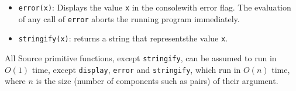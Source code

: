 \begin{itemize}
\item \texttt{error(x)}: Displays the value \texttt{x} in the console\footnotemark[\value{footnote}] with error flag. The evaluation
  of any call of \texttt{error} aborts the running program immediately.
\item \verb#stringify#\texttt{(x)}: returns a string that represents\footnotemark[\value{footnote}] the value \texttt{x}. 
\end{itemize}
All Source primitive functions, except \verb#stringify#, can be assumed to run
in $O(1)$ time, except \texttt{display}, \texttt{error} and \texttt{stringify}, 
which run in $O(n)$ time, where $n$ is
the size (number of components such as pairs) of their argument.
